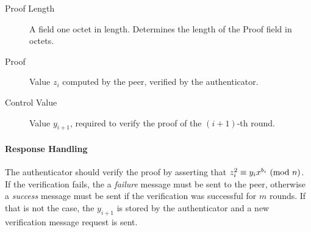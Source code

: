 \begin{description}
	\item [Proof Length] A field one octet in length. Determines the length of the Proof field in octets.
	\item [Proof] Value $z_i$ computed by the peer, verified by the authenticator.
	\item [Control Value] Value $y_{i+1}$, required to verify the proof of the $(i+1)$-th round.
\end{description}

\paragraph{Response Handling}
The authenticator should verify the proof by asserting that $z_i^2 \equiv y_ix^{b_i} \ (\mathrm{mod}\ n)$.
If the verification fails, the a \textit{failure} message must be sent to the peer, otherwise a \textit{success} message must be sent if the verification was successful for $m$ rounds.
If that is not the case, the $y_{i+1}$ is stored by the authenticator and a new verification message request is sent.